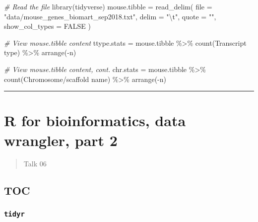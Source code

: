 \documentclass[
]{article}
\newenvironment{Shaded}{}{}
\newcommand{\AttributeTok}[1]{\textcolor[rgb]{0.49,0.56,0.16}{#1}}
\newcommand{\CommentTok}[1]{\textcolor[rgb]{0.38,0.63,0.69}{\textit{#1}}}
\newcommand{\ConstantTok}[1]{\textcolor[rgb]{0.53,0.00,0.00}{#1}}
\newcommand{\FunctionTok}[1]{\textcolor[rgb]{0.02,0.16,0.49}{#1}}
\newcommand{\NormalTok}[1]{#1}
\newcommand{\OtherTok}[1]{\textcolor[rgb]{0.00,0.44,0.13}{#1}}
\newcommand{\SpecialCharTok}[1]{\textcolor[rgb]{0.25,0.44,0.63}{#1}}
\newcommand{\StringTok}[1]{\textcolor[rgb]{0.25,0.44,0.63}{#1}}
\begin{document}
\begin{Shaded}
\begin{Highlighting}[]
\CommentTok{\# Read the file}
\FunctionTok{library}\NormalTok{(tidyverse)}
\NormalTok{mouse.tibble }\OtherTok{=}
  \FunctionTok{read\_delim}\NormalTok{(}
    \AttributeTok{file =} \StringTok{"data/mouse\_genes\_biomart\_sep2018.txt"}\NormalTok{,}
    \AttributeTok{delim =} \StringTok{"}\SpecialCharTok{\textbackslash{}t}\StringTok{"}\NormalTok{,}
    \AttributeTok{quote =} \StringTok{""}\NormalTok{,}
    \AttributeTok{show\_col\_types =} \ConstantTok{FALSE}
\NormalTok{  )}

\CommentTok{\# View mouse.tibble content}
\NormalTok{ttype.stats }\OtherTok{=}
\NormalTok{  mouse.tibble }\SpecialCharTok{\%\textgreater{}\%}
    \FunctionTok{count}\NormalTok{(}\StringTok{\textasciigrave{}}\AttributeTok{Transcript type}\StringTok{\textasciigrave{}}\NormalTok{) }\SpecialCharTok{\%\textgreater{}\%}
    \FunctionTok{arrange}\NormalTok{(}\SpecialCharTok{{-}}\NormalTok{n)}

\CommentTok{\# View mouse.tibble content, cont.}
\NormalTok{chr.stats }\OtherTok{=}
\NormalTok{  mouse.tibble }\SpecialCharTok{\%\textgreater{}\%}
    \FunctionTok{count}\NormalTok{(}\StringTok{\textasciigrave{}}\AttributeTok{Chromosome/scaffold name}\StringTok{\textasciigrave{}}\NormalTok{) }\SpecialCharTok{\%\textgreater{}\%}
    \FunctionTok{arrange}\NormalTok{(}\SpecialCharTok{{-}}\NormalTok{n)}
\end{Highlighting}
\end{Shaded}

\begin{center}\rule{0.5\linewidth}{0.5pt}\end{center}

\hypertarget{r-for-bioinformatics-data-wrangler-part-2}{%
\section{R for bioinformatics, data wrangler, part
2}\label{r-for-bioinformatics-data-wrangler-part-2}}

\begin{quote}
Talk 06
\end{quote}

\hypertarget{toc-2}{%
\subsection{TOC}\label{toc-2}}

\hypertarget{tidyr}{%
\subsubsection{\texorpdfstring{\texttt{tidyr}}{tidyr}}\label{tidyr}}
\end{document}

